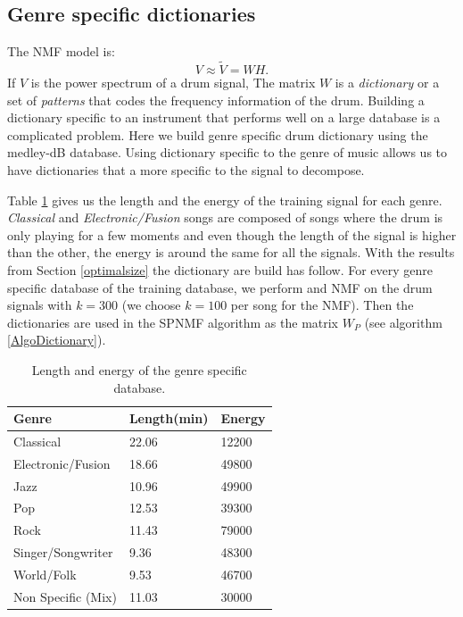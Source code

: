 \documentclass{article}
\begin{document}
\subsection{Genre specific dictionaries}\label{genrespecdict}

The NMF model is:
\begin{equation}
V \approx \tilde{V} = WH.
\end{equation}
If $V$ is the power spectrum of a drum signal, The matrix $W$ is a {\em dictionary} or a set of {\em patterns} that codes the frequency information of the drum. Building a dictionary specific to an instrument that performs well on a large database is a complicated problem. Here we build genre specific drum dictionary using the medley-dB database. Using dictionary specific to the genre of music allows us to have dictionaries that a more specific to the signal to decompose.

Table \ref{lengthDict} gives us the length and the energy of the training signal for each genre. \emph{Classical} and \emph{Electronic/Fusion} songs are composed of songs where the drum is only playing for a few moments and even though the length of the signal is higher than the other, the energy is around the same for all the signals. With the results from Section \ref{optimalsize} the dictionary are build has follow. For every genre specific database of the training database, we perform and NMF on the drum signals with $k=300$ (we choose $k=100$ per song for the NMF). Then the dictionaries are used in the SPNMF algorithm as the matrix $W_P$ (see algorithm \ref{AlgoDictionary}).

\begin{table}
   
	\centering 
   \begin{tabular}{|l|l|l|}
\hline   
Genre & Length(min) & Energy\\
\hline
Classical  & 22.06 & 12200 \\
\hline
Electronic/Fusion & 18.66 & 49800\\
\hline
Jazz & 10.96 & 49900\\
\hline
Pop &  12.53 & 39300\\
\hline
Rock & 11.43& 79000\\
\hline
Singer/Songwriter & 9.36 & 48300\\
\hline
World/Folk & 9.53 & 46700\\
\hline
Non Specific (Mix) & 11.03 & 30000 \\
\hline
  
\end{tabular} 
\caption{\label{lengthDict} Length and energy of the genre specific database.}
\end{table}
\end{document}
